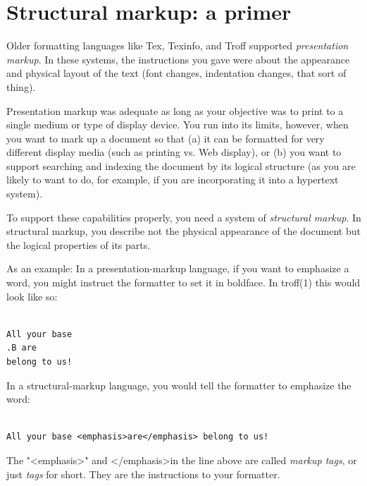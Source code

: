 \documentclass[pdftex,english,a4paper,10pt]{infocom}
\begin{document}
\section{Structural markup: a primer}
\label{id175952}\hypertarget{id175952}{}%

Older formatting languages like Tex, Texinfo, and Troff
supported {\em presentation
markup}.  In these systems, the instructions you
gave were about the appearance and physical layout of the text (font
changes, indentation changes, that sort of thing).

Presentation markup was adequate as long as your objective was
to print to a single medium or type of display device.  You run into
its limits, however, when you want to mark up a document so that (a)
it can be formatted for very different display media (such as printing
vs. Web display), or (b) you want to support searching and indexing the
document by its logical structure (as you are likely to want to do,
for example, if you are incorporating it into a hypertext system).

To support these capabilities properly, you need a system of
{\em structural markup}.  In structural markup, you describe not
the physical appearance of the document but the logical properties of
its parts.

As an example: In a presentation-markup language, if you want to
emphasize a word, you might instruct the formatter to set it in
boldface.  In
troff(1)
this would look like so:

\begin{Verbatim}[]

All your base
.B are
belong to us!

\end{Verbatim}

In a structural-markup language, you would tell the formatter to
emphasize the word:

\begin{Verbatim}[]

All your base <emphasis>are</emphasis> belong to us!

\end{Verbatim}

 The "\textless{}emphasis\textgreater{}" and \textless{}/emphasis\textgreater{}in the line above
are called {\em markup
tags},
or just {\em tags} for short.  They are the
instructions to your formatter.
\end{document}
